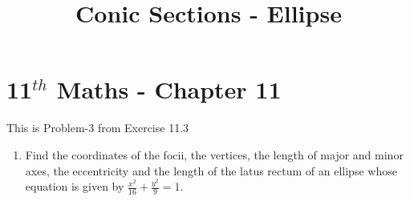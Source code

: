 \documentclass[12pt]{article}
\begin{document}
\begin{center}
\title{\textbf{Conic Sections - Ellipse}}
\date{\vspace{-5ex}} %
\maketitle
\end{center}
\setcounter{page}{1}

\section{11$^{th}$ Maths - Chapter 11}
This is Problem-3 from Exercise 11.3
\begin{enumerate}
\item Find the coordinates of the focii, the vertices, the length of major and minor axes, the eccentricity and the length of the latus rectum of an ellipse whose equation is given by $\frac{x^2}{16}+\frac{y^2}{9}=1$.


\end{enumerate}
\end{document}
